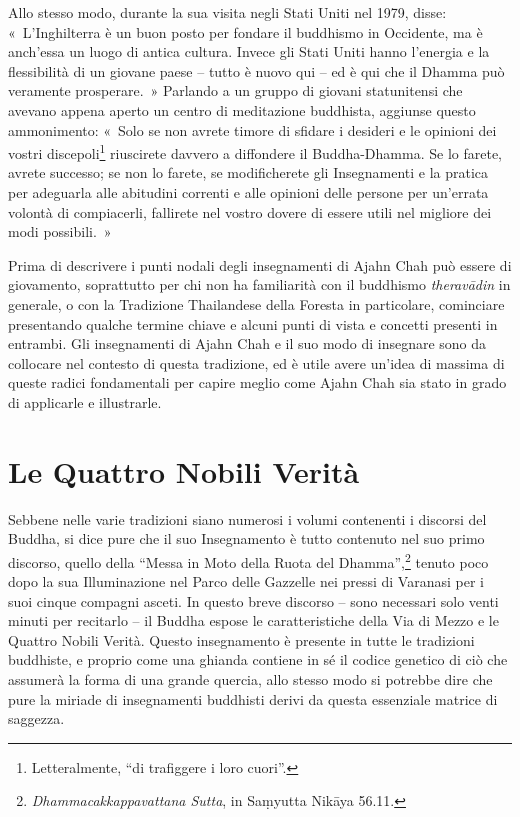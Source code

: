 Allo stesso modo, durante la sua visita negli Stati Uniti nel 1979,
disse: «~L'Inghilterra è un buon posto per fondare il buddhismo in
Occidente, ma è anch'essa un luogo di antica cultura. Invece gli Stati
Uniti hanno l'energia e la flessibilità di un giovane paese -- tutto è
nuovo qui -- ed è qui che il Dhamma può veramente prosperare.~» Parlando
a un gruppo di giovani statunitensi che avevano appena aperto un centro
di meditazione buddhista, aggiunse questo ammonimento: «~Solo se non
avrete timore di sfidare i desideri e le opinioni dei vostri
discepoli\footnote{Letteralmente, ``di trafiggere i loro cuori''.}
riuscirete davvero a diffondere il Buddha-Dhamma. Se lo farete, avrete
successo; se non lo farete, se modificherete gli Insegnamenti e la
pratica per adeguarla alle abitudini correnti e alle opinioni delle
persone per un'errata volontà di compiacerli, fallirete nel vostro
dovere di essere utili nel migliore dei modi possibili.~»

Prima di descrivere i punti nodali degli insegnamenti di Ajahn Chah può
essere di giovamento, soprattutto per chi non ha familiarità con il
\mbox{buddhismo} \emph{theravādin} in generale, o con la Tradizione Thailandese
della Foresta in particolare, cominciare presentando qualche termine
chiave e alcuni punti di vista e concetti presenti in entrambi. Gli
insegnamenti di Ajahn Chah e il suo modo di insegnare sono da collocare
nel contesto di questa tradizione, ed è utile avere un'idea di massima
di queste radici fondamentali per capire meglio come Ajahn Chah sia
stato in grado di applicarle e illustrarle.

\section{Le Quattro Nobili Verità}

Sebbene nelle varie tradizioni siano numerosi i volumi contenenti i
discorsi del Buddha, si dice pure che il suo Insegnamento è tutto
contenuto nel suo primo discorso, quello della ``Messa in Moto della
Ruota del Dhamma'',\footnote{\emph{Dhammacakkappavattana Sutta}, in
  Saṃyutta Nikāya 56.11.} tenuto poco dopo la sua Illuminazione
nel Parco delle Gazzelle nei pressi di Varanasi per i suoi cinque
compagni asceti. In questo breve discorso -- sono necessari solo venti
minuti per recitarlo -- il Buddha espose le caratteristiche della Via di
Mezzo e le Quattro Nobili Verità. Questo insegnamento è presente in
tutte le tradizioni buddhiste, e proprio come una ghianda contiene in sé
il codice genetico di ciò che assumerà la forma di una grande quercia,
allo stesso modo si potrebbe dire che pure la miriade di insegnamenti
buddhisti derivi da questa essenziale matrice di saggezza.


